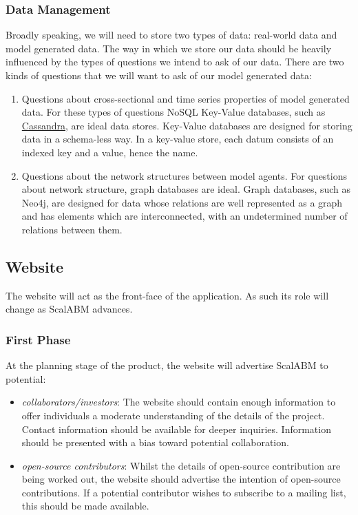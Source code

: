\documentclass[a4paper]{article}
\begin{document}
\subsubsection{Data Management}
Broadly speaking, we will need to store two types of data: real-world data and model generated data. The way in which we store our data should be heavily influenced by the types of questions we intend to ask of our data. 
There are two kinds of questions that we will want to ask of our model generated data:
\begin{enumerate}
    \item Questions about cross-sectional and time series properties of model generated data. For these types of questions NoSQL Key-Value databases, such as \href{http://cassandra.apache.org/}{Cassandra},  are ideal data stores. Key-Value databases are designed for storing data in a schema-less way. In a key-value store, each datum consists of an indexed key and a value, hence the name. 
    \item Questions about the network structures between model agents. For questions about network structure, graph databases are ideal. Graph databases, such as Neo4j, are designed for data whose relations are well represented as a graph and has elements which are interconnected, with an undetermined number of relations between them.
\end{enumerate} 

\subsection{Website}

The website will act as the front-face of the application. As such its role will change as ScalABM advances. 

\subsubsection{First Phase}

At the planning stage of the product, the website will advertise ScalABM to potential:

\begin{itemize}
\item \textit{collaborators/investors}: The website should contain enough information to offer individuals a moderate understanding of the details of the project. Contact information should be available for deeper inquiries. Information should be presented with a bias toward potential collaboration.
\item \textit{open-source contributors}: Whilst the details of open-source contribution are being worked out, the website should advertise the intention of open-source contributions. If a potential contributor wishes to subscribe to a mailing list, this should be made available.
\end{itemize}
\end{document}
